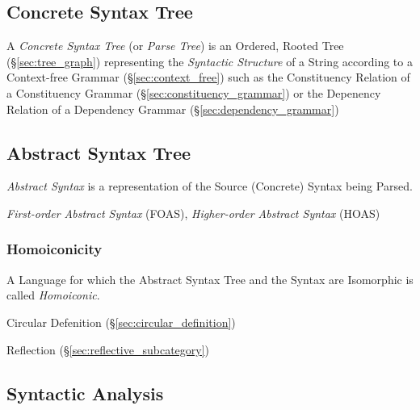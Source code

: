 \subsection{Concrete Syntax Tree}\label{sec:concrete_syntax}

A \emph{Concrete Syntax Tree} (or \emph{Parse Tree}) is an Ordered,
Rooted Tree (\S\ref{sec:tree_graph}) representing the \emph{Syntactic
  Structure} of a String according to a Context-free Grammar
(\S\ref{sec:context_free}) such as the Constituency Relation of a
Constituency Grammar (\S\ref{sec:constituency_grammar}) or the
Depenency Relation of a Dependency Grammar
(\S\ref{sec:dependency_grammar})



\subsection{Abstract Syntax Tree}\label{sec:abstract_syntax}

\emph{Abstract Syntax} is a representation of the Source (Concrete)
Syntax being Parsed.

\emph{First-order Abstract Syntax} (FOAS), \emph{Higher-order Abstract
  Syntax} (HOAS)



\subsubsection{Homoiconicity}\label{sec:homoiconicity}

A Language for which the Abstract Syntax Tree and the Syntax are
Isomorphic is called \emph{Homoiconic}.

Circular Defenition (\S\ref{sec:circular_definition})

Reflection (\S\ref{sec:reflective_subcategory})



\subsection{Syntactic Analysis}\label{sec:syntactic_analysis}

